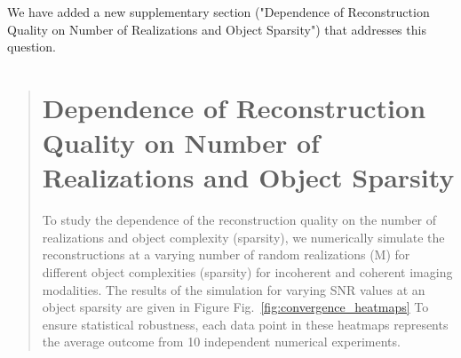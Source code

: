 \documentclass[12pt]{article}
\newcommand{\hlred}[1]{\sethlcolor{red!30}\hl{#1}}
\newenvironment{ourresponse}
    {\begin{tcolorbox}[width=\linewidth,breakable,enhanced,colback=gray!5,colframe=responsecolor!50,title=Response,left=5pt,right=5pt]}
    {\end{tcolorbox}}
\begin{document}
\begin{enumerate}[label=\arabic*.]
\begin{ourresponse}
        We have added a new supplementary section ("Dependence of Reconstruction Quality on Number of Realizations and Object Sparsity") that addresses this question.
        
        
        \begin{quote}
            \section{Dependence of Reconstruction Quality on Number of Realizations and Object Sparsity}


            
            To study the dependence of the reconstruction quality on the number of realizations and object complexity (sparsity), we numerically simulate the reconstructions at a varying number of random realizations (M) for different object complexities (sparsity) for incoherent and coherent imaging modalities.
            The results of the simulation for varying SNR values at an object sparsity are given in Figure Fig.~\ref{fig:convergence_heatmaps}
            To ensure statistical robustness, each data point in these heatmaps represents the average outcome from 10 independent numerical experiments.


\end{quote}
\end{ourresponse}
\end{enumerate}
\end{document}
